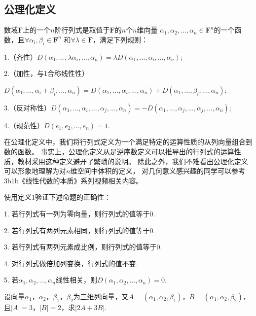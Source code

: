 \subsection{公理化定义}
\begin{definition}
	数域$\mathbf{F}$上的一个$n$阶行列式是取值于$\mathbf{F}$的$n$个$n$维向量
	$\alpha_1,\alpha_2,\dots,\alpha_n \in \mathbf{F}^n$的一个函数，且$\forall \alpha_i,\beta_i \in \mathbf{F}^n$
	和$\forall \lambda \in \mathbf{F}$，满足下列规则：
	
	\textup{1}.（齐性）$D(\alpha_1,\dots,\lambda\alpha_i,\dots,\alpha_n)=\lambda D(\alpha_1,\dots,\alpha_i,\dots,\alpha_n)$\textup{;}

	\textup{2}.（加性，与\textup{1}合称线性性）
	
	$D(\alpha_1,\dots,\alpha_i+\beta_i,\dots,\alpha_n)=D(\alpha_1,\dots,\alpha_i,\dots,\alpha_n)+D(\alpha_1,\dots,\beta_i,\dots,\alpha_n)$\textup{;}

	\textup{3}.（反对称性）$D(\alpha_1,\dots,\alpha_i,\dots,\alpha_j,\dots,\alpha_n)=-D(\alpha_1,\dots,\alpha_j,\dots,\alpha_j,\dots,\alpha_n)$\textup{;}

	\textup{4}.（规范性）$D(e_1,e_2,\dots,e_n)=1$.
\end{definition}
在公理化定义中，我们将行列式定义为一个满足特定的运算性质的从列向量组合到数的函数。
事实上，公理化定义从是逆序数定义可以推导出的行列式的运算性质，教材采用这种定义避开了繁琐的说明。
除此之外，我们不难看出公理化定义可以形象地理解为对$n$维空间中体积的定义，
对几何意义感兴趣的同学可以参考3b1b《线性代数的本质》系列视频相关内容。
\begin{example}
	使用定义$1$验证下述命题的正确性：

	\textup{1}. 若行列式有一列为零向量，则行列式的值等于$0$.

	\textup{2}. 若行列式有两列元素相同，则行列式的值等于$0$.

	\textup{3}. 若行列式有两列元素成比例，则行列式的值等于$0$.

	\textup{4}. 对行列式做倍加列变换，行列式的值不变.

	\textup{5}. 若$\alpha_1,\alpha_2,\dots,\alpha_n$线性相关，则$D(\alpha_1,\alpha_2,\dots,\alpha_n)=0$.
\end{example}

\begin{example}
	设向量$\alpha_1$，$\alpha_2$，$\beta_1$，$\beta_2$为三维列向量，又$A=(\alpha_1,\alpha_2,\beta_1)$，$B=(\alpha_1,\alpha_2,\beta_2)$，
	且$|A|=3$，$|B|=2$，求$|2A+3B|$.
\end{example}

